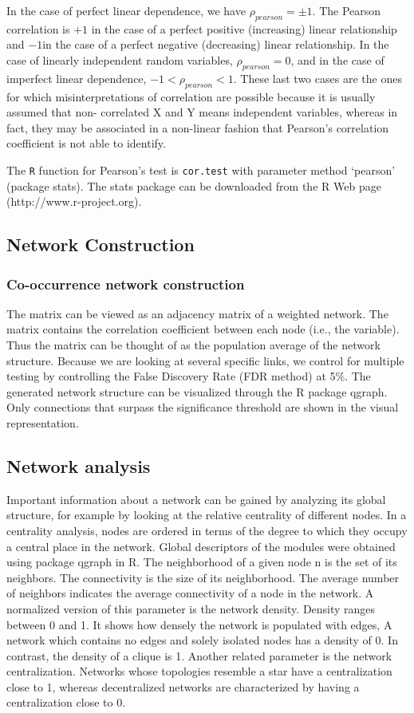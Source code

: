 \documentclass[a4paper]{article}
\begin{document}
In the case of perfect linear dependence, we have $\rho_{pearson} = \pm1$. The Pearson correlation is $+1$ in the case of a perfect positive (increasing) linear relationship and $-1 $in the case of a perfect negative (decreasing) linear relationship. In the case of linearly independent random variables, $\rho_{pearson} = 0$, and in the case of imperfect linear dependence, $-1 < \rho_{pearson} < 1$. These last two cases are the ones for which misinterpretations of correlation are possible because it is usually assumed that non- correlated X and Y means independent variables, whereas in fact, they may be associated in a non-linear fashion that Pearson’s correlation coefficient is not able to identify.

The \texttt{R} function for Pearson’s test is \texttt{cor.test} with parameter method `pearson' (package stats). The stats package can be downloaded from the R  Web page (http://www.r-project.org).


\subsection*{Network Construction}
\subsubsection*{Co-occurrence network construction}
The matrix can be viewed as an adjacency matrix of a weighted network. The matrix  contains the correlation coefficient  between each node (i.e., the variable). Thus the matrix  can be thought of as the population average of the network structure. Because we are looking at several specific links, we control for multiple testing by controlling the False Discovery Rate (FDR method) at 5\%. The generated network structure can be visualized through the R package qgraph. Only connections that surpass the significance threshold are shown in the visual representation.

\subsection*{Network analysis}
Important information about a network can be gained by analyzing its global structure, for example by looking at the relative centrality of different nodes. In a centrality analysis, nodes are ordered in terms of the degree to which they occupy a central place in the network. Global descriptors of the modules were obtained using package qgraph in R. The neighborhood of a given node n is the set of its neighbors. The connectivity is the size of its neighborhood. The average number of neighbors indicates the average connectivity of a node in the network. A normalized version of this parameter is the network density. Density ranges between 0 and 1. It shows how densely the network is populated with edges, A network which contains no edges and solely isolated nodes has a density of 0. In contrast, the density of a clique is 1. Another related parameter is the network centralization. Networks whose topologies resemble a star have a centralization close to 1, whereas decentralized networks are characterized by having a centralization close to 0.
\end{document}
